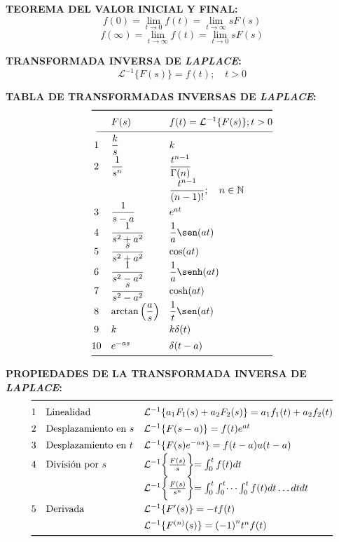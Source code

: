 \documentclass[letter,twoside,8pt]{article}
\begin{document}
\textbf{TEOREMA DEL VALOR INICIAL Y FINAL:}
\begin{equation*}
    f(0)=\lim_{t\rightarrow{0}}f(t)=\lim_{t\rightarrow\infty}sF(s)
\end{equation*}
\begin{equation*}
    f(\infty)=\lim_{t\rightarrow\infty}f(t)=\lim_{t\rightarrow{0}}sF(s)
\end{equation*}

\textbf{TRANSFORMADA INVERSA DE \emph{LAPLACE}:}
\begin{equation*}
    \mathcal{L}^{-1}\{F(s)\}=f(t);\quad{t}>0
\end{equation*}

\textbf{TABLA DE TRANSFORMADAS INVERSAS DE \emph{LAPLACE}:}
\begin{equation*}
\def\arraystretch{1.4}
\begin{array}{@{}cll@{}}
\toprule
 & F(s) & f(t)=\mathcal{L}^{-1}\{F(s)\};t>0\\
\cmidrule(l){1-3}
 1 & \dfrac{k}{s}
   & k\\
 2 & \dfrac{1}{s^n}
   & \dfrac{t^{n-1}}{\Gamma(n)}\\
   &
   & \dfrac{t^{n-1}}{(n-1)!};\quad{n}\in\mathbb{N}\\
 3 & \dfrac{1}{s-a}
   & e^{at}\\
 4 & \dfrac{1}{s^2+a^2}
   & \dfrac{1}{a}\sen(at)\\
 5 & \dfrac{s}{s^2+a^2}
   & \cos(at)\\
 6 & \dfrac{1}{s^2-a^2}
   & \dfrac{1}{a}\senh(at)\\
 7 & \dfrac{s}{s^2-a^2}
   & \cosh(at)\\
 8 & \arctan\left(\dfrac{a}{s}\right)
   & \dfrac{1}{t}\sen(at)\\
 9 & k
   & k\delta(t)\\
10 & e^{-as}
   & \delta(t-a)\\
\bottomrule
\end{array}
\end{equation*}

\textbf{PROPIEDADES DE LA TRANSFORMADA INVERSA DE \emph{LAPLACE}:}
\begin{equation*}
\def\arraystretch{1.4}
\begin{array}{@{}cll@{}}
\toprule
 1 & \text{Linealidad}
   & \mathcal{L}^{-1}\{a_1F_1(s)+a_2F_2(s)\}=a_1f_1(t)+a_2f_2(t)\\
 2 & \text{Desplazamiento en }s
   & \mathcal{L}^{-1}\{F(s-a)\}=f(t)e^{at}\\
 3 & \text{Desplazamiento en }t
   & \mathcal{L}^{-1}\{F(s)e^{-as}\}=f(t-a)u(t-a)\\
 4 & \text{División por }s
   & \mathcal{L}^{-1}\biggl\{\frac{F(s)}{s}\biggl\}=\int_0^{t}f(t){dt}\\
   &
   & \mathcal{L}^{-1}\biggl\{\frac{F(s)}{s^n}\biggl\}=\int_0^t\int_0^t\dots\int_0^{t}f(t){dt}\dots{dt}{dt}\\
 5 & \text{Derivada}
   & \mathcal{L}^{-1}\{F^{\prime}(s)\}={-t}f(t)\\
   &
   & \mathcal{L}^{-1}\{F^{(n)}(s)\}={(-1)}^{n}t^{n}f(t)\\
\bottomrule
\end{array}
\end{equation*}
\end{document}
